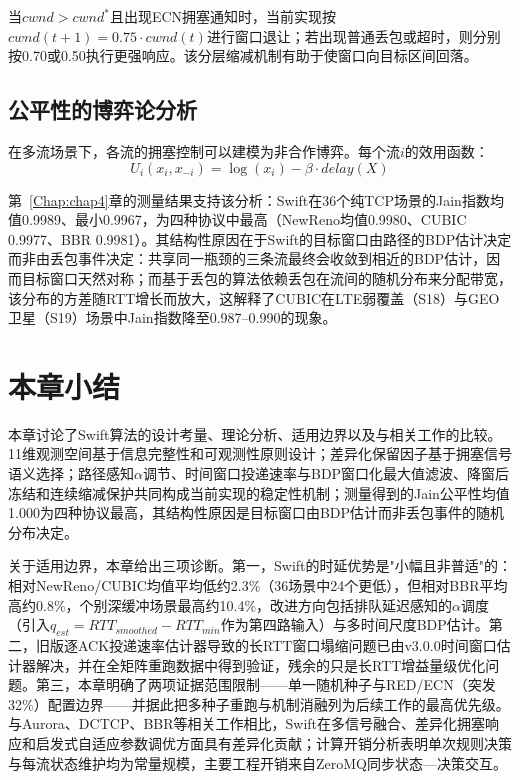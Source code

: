 当$cwnd > cwnd^*$且出现ECN拥塞通知时，当前实现按$cwnd(t+1) = 0.75 \cdot cwnd(t)$进行窗口退让；若出现普通丢包或超时，则分别按0.70或0.50执行更强响应。该分层缩减机制有助于使窗口向目标区间回落。

\subsection{公平性的博弈论分析}

在多流场景下，各流的拥塞控制可以建模为非合作博弈。每个流$i$的效用函数：
\begin{equation}
U_i(x_i, x_{-i}) = \log(x_i) - \beta \cdot delay(X)
\end{equation}

第~\ref{Chap:chap4}章的测量结果支持该分析：Swift在36个纯TCP场景的Jain指数均值0.9989、最小0.9967，为四种协议中最高（NewReno均值0.9980、CUBIC 0.9977、BBR 0.9981）。其结构性原因在于Swift的目标窗口由路径的BDP估计决定而非由丢包事件决定：共享同一瓶颈的三条流最终会收敛到相近的BDP估计，因而目标窗口天然对称；而基于丢包的算法依赖丢包在流间的随机分布来分配带宽，该分布的方差随RTT增长而放大，这解释了CUBIC在LTE弱覆盖（S18）与GEO卫星（S19）场景中Jain指数降至0.987--0.990的现象。

\section{本章小结}

本章讨论了Swift算法的设计考量、理论分析、适用边界以及与相关工作的比较。11维观测空间基于信息完整性和可观测性原则设计；差异化保留因子基于拥塞信号语义选择；路径感知$\alpha$调节、时间窗口投递速率与BDP窗口化最大值滤波、降窗后冻结和连续缩减保护共同构成当前实现的稳定性机制；测量得到的Jain公平性均值1.000为四种协议最高，其结构性原因是目标窗口由BDP估计而非丢包事件的随机分布决定。

关于适用边界，本章给出三项诊断。第一，Swift的时延优势是"小幅且非普适"的：相对NewReno/CUBIC均值平均低约2.3\%（36场景中24个更低），但相对BBR平均高约0.8\%，个别深缓冲场景最高约10.4\%，改进方向包括排队延迟感知的$\alpha$调度（引入$q_{est}=RTT_{smoothed}-RTT_{min}$作为第四路输入）与多时间尺度BDP估计。第二，旧版逐ACK投递速率估计器导致的长RTT窗口塌缩问题已由v3.0.0时间窗口估计器解决，并在全矩阵重跑数据中得到验证，残余的只是长RTT增益量级优化问题。第三，本章明确了两项证据范围限制——单一随机种子与RED/ECN（突发32\%）配置边界——并据此把多种子重跑与机制消融列为后续工作的最高优先级。与Aurora、DCTCP、BBR等相关工作相比，Swift在多信号融合、差异化拥塞响应和启发式自适应参数调优方面具有差异化贡献；计算开销分析表明单次规则决策与每流状态维护均为常量规模，主要工程开销来自ZeroMQ同步状态—决策交互。

